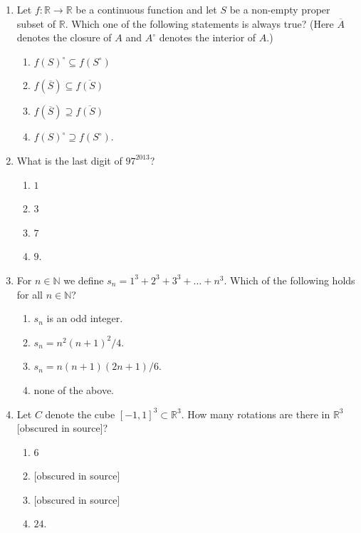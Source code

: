\documentclass[11pt, a4paper]{article}
\begin{document}
\begin{enumerate}
  \item Let $f: \mathbb{R} \to \mathbb{R}$ be a continuous function and let $S$ be a non-empty proper subset of $\mathbb{R}$. Which one of the following statements is always true? (Here $\overline{A}$ denotes the closure of $A$ and $A^\circ$ denotes the interior of $A$.)
  \begin{enumerate}[label=\Alph*.]
    \item $f(S)^\circ \subseteq f(S^\circ)$
    \item $f(\overline{S}) \subseteq \overline{f(S)}$
    \item $f(\overline{S}) \supseteq \overline{f(S)}$
    \item $f(S)^\circ \supseteq f(S^\circ)$.
  \end{enumerate}

  \item What is the last digit of $97^{2013}$?
  \begin{enumerate}[label=\Alph*.]
    \item $1$
    \item $3$
    \item $7$
    \item $9$.
  \end{enumerate}

  \item For $n \in \mathbb{N}$ we define $s_n = 1^3 + 2^3 + 3^3 + \dots + n^3$. Which of the following holds for all $n \in \mathbb{N}$?
  \begin{enumerate}[label=\Alph*.]
    \item $s_n$ is an odd integer.
    \item $s_n = n^2(n + 1)^2 / 4$.
    \item $s_n = n(n + 1)(2n + 1) / 6$.
    \item none of the above.
  \end{enumerate}

  \item Let $C$ denote the cube $[-1, 1]^3 \subset \mathbb{R}^3$. How many rotations are there in $\mathbb{R}^3$ {[obscured in source]}?
  \begin{enumerate}[label=\Alph*.]
    \item $6$
    \item {[obscured in source]}
    \item {[obscured in source]}
    \item $24$.
  \end{enumerate}
\end{enumerate}
\end{document}
